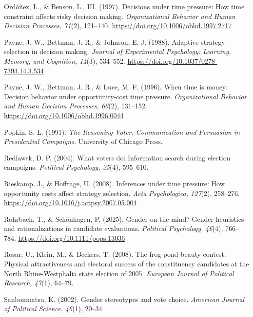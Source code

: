 \documentclass[11pt]{article}\usepackage[]{graphicx}\usepackage[]{xcolor}
\begin{document}
{\begin{list}{}{%
  \setlength{\leftmargin}{1.5em}%
  \setlength{\itemindent}{-1.5em}%
  \setlength{\itemsep}{0pt}%
  \setlength{\parsep}{0pt}%
  \setlength{\topsep}{1pt}%
}
\item Ord\'o\~nez, L., \& Benson, L., III. (1997). Decisions under time pressure: How time constraint affects risky decision making. \emph{Organizational Behavior and Human Decision Processes, 71}(2), 121--140. \url{https://doi.org/10.1006/obhd.1997.2717}

\item Payne, J. W., Bettman, J. R., \& Johnson, E. J. (1988). Adaptive strategy selection in decision making. \emph{Journal of Experimental Psychology: Learning, Memory, and Cognition, 14}(3), 534--552. \url{https://doi.org/10.1037/0278-7393.14.3.534}

\item Payne, J. W., Bettman, J. R., \& Luce, M. F. (1996). When time is money: Decision behavior under opportunity-cost time pressure. \emph{Organizational Behavior and Human Decision Processes, 66}(2), 131--152. \url{https://doi.org/10.1006/obhd.1996.0044}

\item Popkin, S. L. (1991). \emph{The Reasoning Voter: Communication and Persuasion in Presidential Campaigns}. University of Chicago Press.

\item Redlawsk, D. P. (2004). What voters do: Information search during election campaigns. \emph{Political Psychology, 25}(4), 595--610.

\item Rieskamp, J., \& Hoffrage, U. (2008). Inferences under time pressure: How opportunity costs affect strategy selection. \emph{Acta Psychologica, 127}(2), 258--276. \url{https://doi.org/10.1016/j.actpsy.2007.05.004}

\item Rohrbach, T., \& Sch\"onhagen, P. (2025). Gender on the mind? Gender heuristics and rationalizations in candidate evaluations. \emph{Political Psychology, 46}(4), 766--784. \url{https://doi.org/10.1111/pops.13036}

\item Rosar, U., Klein, M., \& Beckers, T. (2008). The frog pond beauty contest: Physical attractiveness and electoral success of the constituency candidates at the North Rhine-Westphalia state election of 2005. \emph{European Journal of Political Research, 47}(1), 64--79.

\item Sanbonmatsu, K. (2002). Gender stereotypes and vote choice. \emph{American Journal of Political Science, 46}(1), 20--34.


\end{list}}
\end{document}
